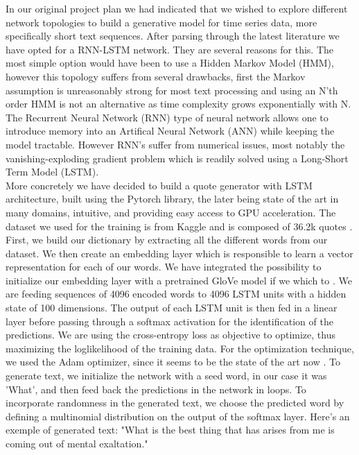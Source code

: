 


In our original project plan we had indicated that we wished to explore 
different network topologies to build a generative model for time series 
data, more specifically short text sequences. After parsing through the latest
literature we have opted for a RNN-LSTM network. They are several reasons for
this. The most simple option would have been to use a Hidden Markov Model
(HMM), however this topology suffers from several drawbacks, first the 
Markov assumption is unreasonably strong for most text processing and 
using an N'th order HMM is not an alternative as time complexity grows 
exponentially with N. The Recurrent Neural Network (RNN) type of neural
network allows one to introduce memory into an Artifical Neural Network (ANN)
while keeping the model tractable. However RNN's suffer from numerical issues,
most notably the vanishing-exploding gradient problem which is readily solved
using a Long-Short Term Model (LSTM). \\

More concretely we have decided to build a quote generator with LSTM architecture,
built using the Pytorch library, the later being state of the art in many 
domains, intuitive, and providing easy access to GPU acceleration.  The dataset
we used for the training is from Kaggle and is composed of 36.2k quotes
\cite{quote}. First, we build our dictionary by extracting all the different
words from our dataset. We then create an embedding layer which is responsible
to learn a vector representation for each of our words. We have integrated the
possibility to initialize our embedding layer with a pretrained GloVe model if
we which to \cite{glove}. We are feeding sequences of 4096 encoded words to
4096 LSTM units with a hidden state of 100 dimensions. The output of each LSTM
unit is then fed in a linear layer before passing through a softmax activation
for the identification of the predictions. We are using the cross-entropy loss
as objective to optimize, thus maximizing the loglikelihood of the training
data. For the optimization technique, we used the Adam optimizer, since it
seems to be the state of the art now \cite{adam}. To generate text, we
initialize the network with a seed word, in our case it was 'What', and then
feed back the predictions in the
network in loops. To incorporate randomness in the generated text, we choose
the predicted word by defining a multinomial distribution on the output of the
softmax layer. Here's an exemple of generated text: "What is the best thing
that has arises from me is coming out of mental exaltation."    

\clearpage

 

